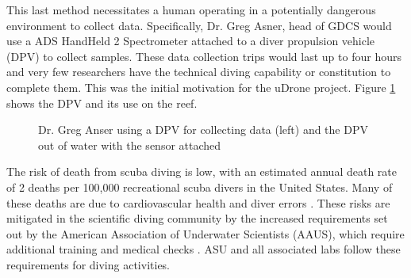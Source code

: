 This last method necessitates a human operating in a potentially dangerous environment to collect data. Specifically, Dr. Greg Asner, head of GDCS would use a ADS HandHeld 2 Spectrometer attached to a diver propulsion vehicle (DPV) to collect samples. These data collection trips would last up to four hours and very few researchers have the technical diving capability or constitution to complete them. This was the initial motivation for the uDrone project. Figure \ref{asner} shows the DPV and its use on the reef. 

\begin{figure}[h]
\centering
{}
\caption[DPV Deployed to Collect Reef Data]{Dr. Greg Anser using a DPV for collecting data (left) and the DPV out of water with the sensor attached}
\label{asner}
\end{figure}

The risk of death from scuba diving is low, with an estimated annual death rate of 2 deaths per 100,000 recreational scuba divers in the United States. Many of these deaths are due to cardiovascular health and diver errors \parencite{dan}. These risks are mitigated in the scientific diving community by the increased requirements set out by the American Association of Underwater Scientists (AAUS), which require additional training and medical checks \parencite{aaus}. ASU and all associated labs follow these requirements for diving activities.

